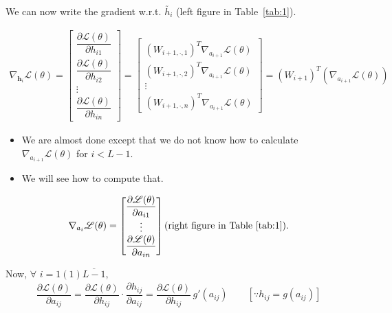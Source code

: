\documentclass[11pt, a4paper]{article}
\begin{document}
We can now write the gradient w.r.t. $\utilde{h_i}$ (left figure in Table~\ref{tab:1}).

\begin{align*}
\nabla_{\mathbf{h}_i} \mathscr{L}(\theta)
=
\begin{bmatrix}
\dfrac{\partial \mathscr{L}(\theta)}{\partial h_{i1}} \\[1em]
\dfrac{\partial \mathscr{L}(\theta)}{\partial h_{i2}} \\[1em]
\vdots \\[1em]
\dfrac{\partial \mathscr{L}(\theta)}{\partial h_{in}}
\end{bmatrix}
=
\begin{bmatrix}
\left(W_{i+1,\cdot,1}\right)^T \nabla_{a_{i+1}} \mathscr{L}(\theta) \\[1em]
\left(W_{i+1,\cdot,2}\right)^T \nabla_{a_{i+1}} \mathscr{L}(\theta) \\[1em]
\vdots \\[1em]
\left(W_{i+1,\cdot,n}\right)^T \nabla_{a_{i+1}} \mathscr{L}(\theta)
\end{bmatrix}
=
\left(W_{i+1}\right)^T \left(\nabla_{a_{i+1}} \mathscr{L}(\theta)\right)
\end{align*}

\vspace{0.5cm}

\begin{itemize}
    \item We are almost done except that we do not know how to calculate $\nabla_{a_{i+1}} \mathscr{L}(\theta)$ for $i < L-1$.
    \item We will see how to compute that.
\end{itemize}

\vspace{0.2cm}


\[
\nabla_{a_i} \mathscr{L}(\theta) =
\begin{bmatrix}
\dfrac{\partial \mathscr{L}(\theta)}{\partial a_{i1}} \\
\vdots \\
\dfrac{\partial \mathscr{L}(\theta)}{\partial a_{in}}
\end{bmatrix} \text{(right figure in Table~\ref{tab:1}).}
\]


Now, $\forall$ $i = 1(1)\overline{L-1}$,
\begin{align*}
\dfrac{\partial \mathscr{L}(\theta)}{\partial a_{ij}}
= \dfrac{\partial \mathscr{L}(\theta)}{\partial h_{ij}} \cdot \dfrac{\partial h_{ij}}{\partial a_{ij}}
= \dfrac{\partial \mathscr{L}(\theta)}{\partial h_{ij}} \, g'(a_{ij})
\qquad \left[ \because h_{ij} = g(a_{ij}) \right]
\end{align*}
\end{document}
